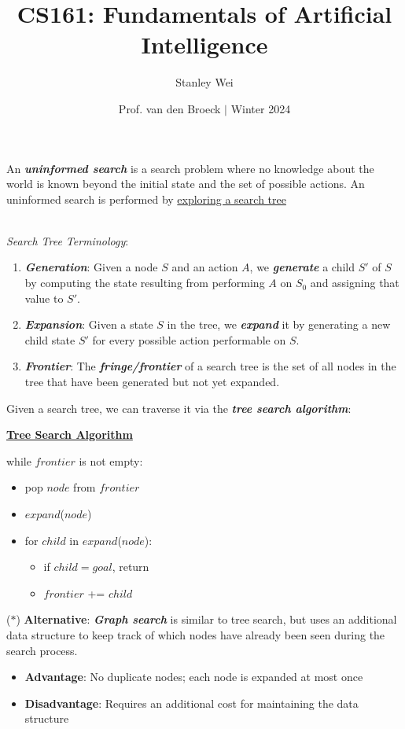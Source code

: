 \documentclass[12pt]{extarticle}
\title{CS161: Fundamentals of Artificial Intelligence}
\author{Stanley Wei}
\date{Prof. van den Broeck $\vert$ Winter 2024}
\theoremstyle{definition}
\theoremstyle{remark}
\newcommand{\pstart}[0]{\noindent}
\newcommand{\newp}[0]{~\\ \pstart}
\newcommand{\term}[1]{\noindent\textbf{\textit{#1}}}
\newcommand{\titleul}[1]{\noindent \textbf{\ul{#1}}}
\begin{document}
\pstart
An \term{uninformed search} is a search problem where no knowledge about the world is known beyond the initial state and the set of possible actions. An uninformed search is performed by \ul{exploring a search tree}

\newp
\textit{Search Tree Terminology}: \begin{enumerate}
    \item \term{Generation}: Given a node $S$ and an action $A$, we \term{generate} a child $S'$ of $S$ by computing the state resulting from performing $A$ on $S_0$ and assigning that value to $S'$.
    \item \term{Expansion}: Given a state $S$ in the tree, we \term{expand} it by generating a new child state $S'$ for every possible action performable on $S$.
    \item \term{Frontier}: The \term{fringe/frontier} of a search tree is the set of all nodes in the tree that have been generated but not yet expanded.
\end{enumerate}

\vspace{5pt}
\pstart
Given a search tree, we can traverse it via the \term{tree search algorithm}:
\begin{tcolorbox}[colback=blue!40!green!10!white]
    \titleul{Tree Search Algorithm}

    \vspace{5pt}
    while $frontier$ is not empty: \begin{itemize}
        \item[] pop $node$ from $frontier$
        \item[] $expand$($node$)
        \item[] for $child$ in $expand$($node$): \begin{itemize}
            \item[] if $child=goal$, return
            \item[] $frontier$ += $child$ 
        \end{itemize}
    \end{itemize} 
\end{tcolorbox}

\vspace{5pt} \pstart
($\ast$) \textbf{Alternative}: \term{Graph search} is similar to tree search, but uses an additional data structure to keep track of which nodes have already been seen during the search process. \begin{itemize}
    \item \textbf{Advantage}: No duplicate nodes; each node is expanded at most once
    \item \textbf{Disadvantage}: Requires an additional cost for maintaining the data structure
\end{itemize}
\end{document}

